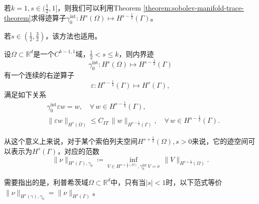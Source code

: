 \begin{lemma}
  若$k=1, s \in ( \frac{1}{2}, 1]$，则我们可以利用Theorem \ref{theorem:sobolev-manifold-trace-theorem}求得迹算子$\gamma_0^{\text{int}} : H^s(\Omega) \mapsto H^{s - \frac{1}{2}}(\Gamma)$。

  若$s \in (\frac{1}{2}, \frac{3}{2})$，该方法也适用\citep[Theorem 3.38]{McLean:2000ta}。
\end{lemma}

\begin{theorem}[索伯列夫空间的逆迹定理]
  \label{theorem:sobolev-manifold-inverse-trace-theorem}
  设$\Omega \subset \mathbb{R}^d$是一个$C^{k-1,1}$域，$\frac{1}{2} < s \le k$，则内界迹
  \begin{equation*}
    \gamma_0^{\text{int}} : H^s(\Omega) \mapsto H^{s - \frac{1}{2}}(\Gamma)
  \end{equation*}
  有一个连续的右逆算子
  \begin{equation*}
    \mathcal{\varepsilon}: H^{s-\frac{1}{2}}(\Gamma) \mapsto H^{s}(\Gamma),
  \end{equation*}
满足如下关系
\begin{equation*}
  \begin{split}
    &\gamma_0^{\text{int}} \mathbb{\varepsilon} w = w, \quad \forall \, w \in H^{s-\frac{1}{2}}(\Gamma), \\
    &\big\| \mathbb{\varepsilon} w \big\|_{H^{s}(\Omega)} \le C_{IT} \, \big\| w \big\|_{H^{s-\frac{1}{2}}(\Gamma)}, \quad \forall \, w \in H^{s-\frac{1}{2}}(\Gamma).
  \end{split}
\end{equation*}
\end{theorem}

\begin{definition}[索伯列夫迹空间]
从这个意义上来说，对于某个索伯列夫空间$H^{s+\frac{1}{2}}(\Omega), s > 0$来说，它的迹空间可以表示为$H^{s}(\Gamma)$，对应的范数
\begin{equation*}
  \big\| \nu \big\|_{H^s(\Gamma), \gamma_0} \coloneqq
  \inf_{V \in H^{s + \frac{1}{2}(\Omega)}, \gamma_0^{\text{int}} \, V = \nu} \, \big\| V \big\|_{H^{s + \frac{1}{2}}(\Omega)}.
\end{equation*}
\end{definition}

需要指出的是，利普希茨域$\Omega \subset \mathbb{R}^d$中，只有当$|s| <1$时，以下范式等价$\| \nu \|_{H^{s}(\gamma), \gamma_0} = \| \nu \|_{H^{s}(\Gamma)}$。
